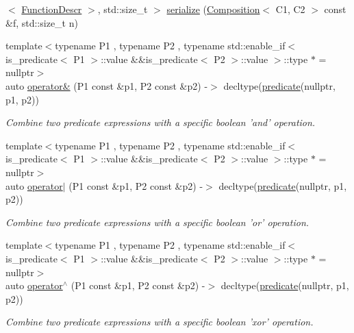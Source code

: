 \begin{DoxyCompactItemize}
$<$ \hyperlink{structpfq_1_1lang_1_1FunctionDescr}{Function\+Descr} $>$, std\+::size\+\_\+t $>$ \hyperlink{namespacepfq_1_1lang_ad5a149c9a27022cf32a497eaac3e9027}{serialize} (\hyperlink{structpfq_1_1lang_1_1Composition}{Composition}$<$ C1, C2 $>$ const \&f, std\+::size\+\_\+t n)
\item 
{\footnotesize template$<$typename P1 , typename P2 , typename std\+::enable\+\_\+if$<$ is\+\_\+predicate$<$ P1 $>$\+::value \&\&is\+\_\+predicate$<$ P2 $>$\+::value $>$\+::type $\ast$  = nullptr$>$ }\\auto \hyperlink{namespacepfq_1_1lang_af24d9c3092f064b0732a4b601dde2c64}{operator\&} (P1 const \&p1, P2 const \&p2) -\/$>$ decltype(\hyperlink{namespacepfq_1_1lang_aca9adafc436b7f851621b979fa1aaf88}{predicate}(nullptr, p1, p2))
\begin{DoxyCompactList}\small\item\em Combine two predicate expressions with a specific boolean 'and' operation. \end{DoxyCompactList}\item 
{\footnotesize template$<$typename P1 , typename P2 , typename std\+::enable\+\_\+if$<$ is\+\_\+predicate$<$ P1 $>$\+::value \&\&is\+\_\+predicate$<$ P2 $>$\+::value $>$\+::type $\ast$  = nullptr$>$ }\\auto \hyperlink{namespacepfq_1_1lang_a425bb535884185450da7addcdb47f35b}{operator$\vert$} (P1 const \&p1, P2 const \&p2) -\/$>$ decltype(\hyperlink{namespacepfq_1_1lang_aca9adafc436b7f851621b979fa1aaf88}{predicate}(nullptr, p1, p2))
\begin{DoxyCompactList}\small\item\em Combine two predicate expressions with a specific boolean 'or' operation. \end{DoxyCompactList}\item 
{\footnotesize template$<$typename P1 , typename P2 , typename std\+::enable\+\_\+if$<$ is\+\_\+predicate$<$ P1 $>$\+::value \&\&is\+\_\+predicate$<$ P2 $>$\+::value $>$\+::type $\ast$  = nullptr$>$ }\\auto \hyperlink{namespacepfq_1_1lang_aa6692a978788617acebfee6ded6ebbbc}{operator$^\wedge$} (P1 const \&p1, P2 const \&p2) -\/$>$ decltype(\hyperlink{namespacepfq_1_1lang_aca9adafc436b7f851621b979fa1aaf88}{predicate}(nullptr, p1, p2))
\begin{DoxyCompactList}\small\item\em Combine two predicate expressions with a specific boolean 'xor' operation. \end{DoxyCompactList}\item 

\end{DoxyCompactItemize}
